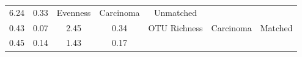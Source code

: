 \documentclass[12pt,]{article}
\begin{document}
\begin{longtable}[]{@{}ccccccc@{}}
\begin{minipage}[t]{0.16\columnwidth}
6.24\strut
\end{minipage} & \begin{minipage}[t]{0.07\columnwidth}\centering\strut
0.33\strut
\end{minipage} & \begin{minipage}[t]{0.14\columnwidth}\centering\strut
Evenness\strut
\end{minipage} & \begin{minipage}[t]{0.09\columnwidth}\centering\strut
Carcinoma\strut
\end{minipage} & \begin{minipage}[t]{0.11\columnwidth}\centering\strut
Unmatched\strut
\end{minipage}\tabularnewline
\begin{minipage}[t]{0.09\columnwidth}\centering\strut
0.43\strut
\end{minipage} & \begin{minipage}[t]{0.16\columnwidth}\centering\strut
0.07\strut
\end{minipage} & \begin{minipage}[t]{0.16\columnwidth}\centering\strut
2.45\strut
\end{minipage} & \begin{minipage}[t]{0.07\columnwidth}\centering\strut
0.34\strut
\end{minipage} & \begin{minipage}[t]{0.14\columnwidth}\centering\strut
OTU Richness\strut
\end{minipage} & \begin{minipage}[t]{0.09\columnwidth}\centering\strut
Carcinoma\strut
\end{minipage} & \begin{minipage}[t]{0.11\columnwidth}\centering\strut
Matched\strut
\end{minipage}\tabularnewline
\begin{minipage}[t]{0.09\columnwidth}\centering\strut
0.45\strut
\end{minipage} & \begin{minipage}[t]{0.16\columnwidth}\centering\strut
0.14\strut
\end{minipage} & \begin{minipage}[t]{0.16\columnwidth}\centering\strut
1.43\strut
\end{minipage} & \begin{minipage}[t]{0.07\columnwidth}\centering\strut
0.17\strut
\end{minipage} & \begin{minipage}[t]{0.14\columnwidth}\centering\strut

\end{minipage}
\end{longtable}
\end{document}
